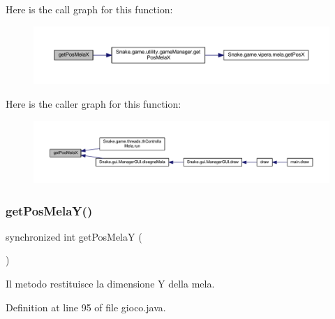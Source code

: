 Here is the call graph for this function\+:
\nopagebreak
\begin{figure}[H]
\begin{center}
\leavevmode
\includegraphics[width=350pt]{class_snake_1_1game_1_1gioco_a64c70d61c15e0cb706c686ddfa016f4e_cgraph}
\end{center}
\end{figure}
Here is the caller graph for this function\+:
\nopagebreak
\begin{figure}[H]
\begin{center}
\leavevmode
\includegraphics[width=350pt]{class_snake_1_1game_1_1gioco_a64c70d61c15e0cb706c686ddfa016f4e_icgraph}
\end{center}
\end{figure}
\mbox{\label{class_snake_1_1game_1_1gioco_a705cd114e2c4c31eb74a4107e9a3e1ae}} 
\subsubsection{\texorpdfstring{get\+Pos\+Mela\+Y()}{getPosMelaY()}}
{\footnotesize\ttfamily synchronized int get\+Pos\+MelaY (\begin{DoxyParamCaption}{ }\end{DoxyParamCaption})}



Il metodo restituisce la dimensione Y della mela. 



Definition at line 95 of file gioco.\+java.

